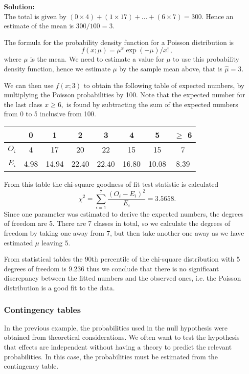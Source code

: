\documentclass[12pt]{article}
\theoremstyle{break}
\begin{document}
\begin{mdframed}
{\bf Solution:}\\
The total is given by $(0 \times 4)+(1 \times 17)+\ldots+(6 \times 7)=300.$ Hence an estimate of the mean is $300/100=3.$

The formula for the probability density function for a Poisson distribution is $$f(x;\mu)=\mu^{x}\exp(-\mu)/x! \, ,$$
where $\mu$ is the mean. We need to estimate a value for $\mu$ to use this probability density function, hence we estimate $\mu$ by the sample mean above, that is $\hat{\mu}=3.$

We can then use $f(x;3)$ to obtain the following table of expected numbers, by multiplying the Poisson probabilities by 100. Note that the expected number for the last class $x \geq 6,$ is found by subtracting the sum of the expected numbers from 0 to 5 inclusive from 100.
\begin{center}
\begin{tabular}{|c|c|c|c|c|c|c|c|}
  \hline
   & 0 & 1 & 2 & 3 & 4 & 5 & $\geq$ 6\\ \hline
  $O_{i}$ & 4 & 17 & 20 & 22 & 15 & 15 & 7 \\ \hline
  $E_{i}$ & 4.98 & 14.94 & 22.40 & 22.40 & 16.80 & 10.08 & 8.39 \\
  \hline
\end{tabular}
\end{center}
From this table the chi-square goodness of fit test statistic is calculated
$$
\chi^{2}=\sum_{i=1}^{7}\frac{(O_{i}-E_{i})^{2}}{E_{i}}=3.5658.
$$
Since one parameter was estimated to derive the expected numbers, the degrees of freedom are 5. There are 7 classes in total, so we calculate the degrees of freedom by taking one away from 7, but then take another one away as we have estimated $\mu$ leaving 5.

From statistical tables the 90th percentile of the chi-square distribution with 5 degrees of freedom is 9.236 thus we conclude that there is no significant discrepancy between the fitted numbers and the observed ones, i.e. the Poisson distribution is a good fit to the data.
\end{mdframed}

\subsubsection{Contingency tables}
In the previous example, the probabilities used in the null hypothesis were obtained from theoretical considerations.  We often want to test the hypothesis that effects are independent without having a theory to predict the relevant probabilities.  In this case, the probabilities must be estimated from the contingency table.
\end{document}
